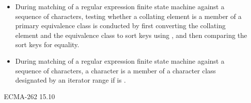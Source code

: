 \begin{itemize}
\item During matching of a regular expression finite state machine against a sequence of
characters, testing whether a collating element is a member of a primary equivalence
class is conducted by first converting the collating element and the equivalence
class to sort keys using , and then comparing the sort
keys for equality.
%
%

\item During matching of a regular expression finite state machine against a sequence
of characters, a character  is a member of a character class designated by an
iterator range  if
 is .
\end{itemize}
\xref ECMA-262 15.10
